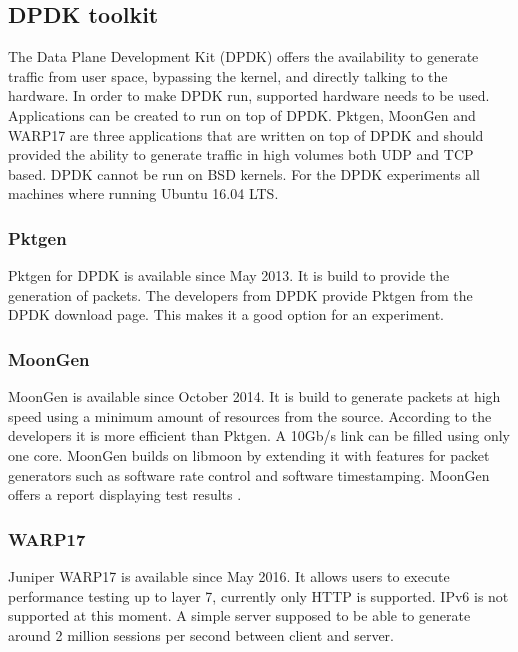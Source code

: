 \subsection{DPDK toolkit}\label{sub:dpdk}
The Data Plane Development Kit\cite{dpdk} (DPDK) offers the availability to generate traffic from user space, bypassing the kernel, and directly talking to the hardware. In order to make DPDK run, supported hardware needs to be used. Applications can be created to run on top of DPDK. Pktgen, MoonGen and WARP17 are three applications that are written on top of DPDK and should provided the ability to generate traffic in high volumes both UDP and TCP based. DPDK cannot be run on BSD kernels. For the DPDK experiments all machines where running Ubuntu 16.04 LTS. 

\subsubsection{Pktgen}\label{subsub:dpdk-pktgen}
Pktgen for DPDK is available since May 2013. It is build to provide the generation of packets. The developers from DPDK provide Pktgen from the DPDK download page. This makes it a good option for an experiment. 

\subsubsection{MoonGen}\label{}
MoonGen is available since October 2014. It is build to generate packets at high speed using a minimum amount of resources from the source. According to the developers it is more efficient than Pktgen. A 10Gb/s link can be filled using only one core. MoonGen builds on libmoon \cite{libmoon} by extending it with features for packet generators such as software rate control and software timestamping. MoonGen offers a report displaying test results \cite{moongenreport}.

\subsubsection{WARP17}\label{subsub:dpdk-WARP17}
Juniper WARP17 is available since May 2016. It allows users to execute performance testing up to layer 7, currently only HTTP is supported. IPv6 is not supported at this moment. A simple server supposed to be able to generate around 2 million sessions per second between client and server.  


